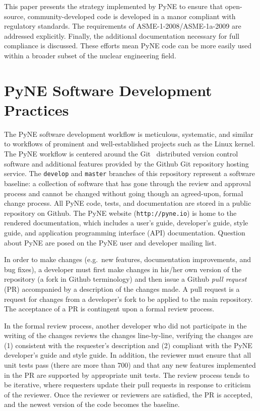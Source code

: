 \documentclass{anstrans}
\begin{document}
This paper presents the strategy implemented by PyNE to ensure that
open-source, community-developed code is developed in a manor compliant with regulatory standards. The requirements of ASME-1-2008/ASME-1a-2009 are addressed
explicitly. Finally, the additional documentation necessary for full compliance
is discussed. These efforts mean PyNE code can be more easily used within a
broader subset of the nuclear engineering field.



\section{PyNE Software Development Practices}

The PyNE software development workflow is meticulous, systematic, and similar
to workflows of prominent and well-established projects such as the Linux kernel.
The PyNE workflow is centered around the Git~\cite{git_2014} distributed version control software
and additional features provided by the Github Git repository hosting service.
The \texttt{develop} and \texttt{master} branches of this repository represent
a software baseline: a collection of software that has gone through the review and
approval process and cannot be changed without going though an agreed-upon, formal change process.
All PyNE code, tests, and documentation are stored in a public
repository on Github. The PyNE website (\texttt{http://pyne.io}) is home to the
rendered documentation, which includes a user's guide, developer's guide, style
guide, and application programming interface (API) documentation.
Question about PyNE are posed on the PyNE user and developer mailing list.

In order to make changes (e.g.\ new features, documentation improvements, and
bug fixes), a developer must first make changes in his/her own version of the
repository (a fork in Github terminology) and then issue a Github \emph{pull request} (PR) accompanied by a description of the changes made. A pull request is a
request for changes from a developer's fork to be applied to the main
repository. The acceptance of a PR is contingent upon a formal review process.


In the formal review process, another developer who did not participate in the writing of the changes
reviews the changes line-by-line, verifying the changes are (1) consistent with
the requester's description and (2) compliant with the PyNE
developer's guide and style guide. In addition, the reviewer must
ensure that all unit tests pass (there are more than 700) and that
any new features implemented in the PR are supported by appropriate unit
tests. The review process tends to be iterative, where requesters update their pull
requests in response to criticism of the reviewer. Once the reviewer or
reviewers are satisfied, the PR is accepted, and the newest version of the
code becomes the baseline.
\end{document}
